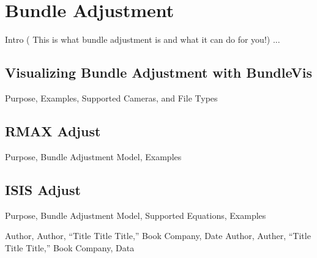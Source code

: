\chapter{Bundle Adjustment}

Intro ( This is what bundle adjustment is and what it can do for you!) ...

\section{Visualizing Bundle Adjustment with BundleVis}

Purpose, Examples, Supported Cameras, and File Types

\section{RMAX Adjust}

Purpose, Bundle Adjustment Model, Examples

\section{ISIS Adjust}

Purpose, Bundle Adjustment Model, Supported Equations, Examples

\begin{thebibliography}{1}

 Author, Author, ``Title Title Title,''
  Book Company, Date
 Author, Auther, ``Title Title Title,''
  Book Company, Data

\end{thebibliography}
